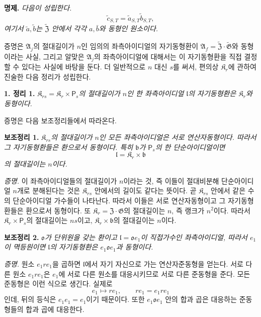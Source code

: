 \noindent\textbf{명제.} \emph{다음이 성립한다.}
\[
        \tilde c_{S,T}
        =\tilde a_{S,T}\tilde b_{S,T},
\]
\emph{여기서 \(\tilde a,\tilde b\)는 \(\widetilde{\mathfrak Z}\) 안에서 각각 \(a,\bar b\)와 동형인 원소이다.}

증명은 \(\mathfrak A_j\)의 절대길이가 \(n\)인 임의의 좌측아이디얼의 자기동형환이 \(\mathfrak A_f=\widetilde{\mathfrak Z}\mathbin{\cdot}\widetilde{\mathfrak G}\)와 동형이라는 사실, 그리고 알맞은 \(\mathfrak A_j\)의 좌측아이디얼에 대해서는 이 자기동형환을 직접 결정할 수 있다는 사실에 바탕을 둔다. 더 일반적으로 \(n\) 대신 \(s\)를 써서, 편의상 \(\mathfrak K_r\)에 관하여 진술한 다음 정리가 성립한다.

\noindent\textbf{1. 정리 1.} \emph{\(\mathfrak K_{rs}=\mathfrak K_r\times\mathsf P_s\)의 절대길이가 \(n\)인 한 좌측아이디얼 \(\mathfrak l\)의 자기동형환은 \(\mathfrak K_r\)와 동형이다.}

증명은 다음 보조정리들에서 따라온다.

\noindent\textbf{보조정리 1.} \emph{\(\mathfrak K_{rs}\)의 절대길이가 \(n\)인 모든 좌측아이디얼은 서로 연산자동형이다. 따라서 그 자기동형환들은 환으로서 동형이다. 특히 \(\mathfrak b\)가 \(\mathsf P_s\)의 한 단순아이디얼이면}
\[
        \mathfrak l=\mathfrak K_r\times\mathfrak b
\]
\emph{의 절대길이는 \(n\)이다.}

\noindent\emph{증명.} 이 좌측아이디얼들의 절대길이가 \(n\)이라는 것, 즉 이들이 절대비분해 단순아이디얼 \(n\)개로 분해된다는 것은 \(\mathfrak K_{rs}\) 안에서의 길이도 같다는 뜻이다. 곧 \(\mathfrak K_{rs}\) 안에서 같은 수의 단순아이디얼 가수들이 나타난다. 따라서 이들은 서로 연산자동형이고 그 자기동형환들은 환으로서 동형이다. 또 \(\mathfrak K_r=\mathfrak Z\mathbin{\cdot}\mathfrak G\)의 절대길이는 \(n\), 즉 랭크가 \(n^2\)이다. 따라서 \(\mathfrak K_r\times\mathsf P_s\)의 절대길이는 \(ns\)이고, \(\mathfrak K_r\times\mathfrak b\)의 절대길이는 \(n\)이다.

\noindent\textbf{보조정리 2.} \emph{\(\mathfrak o\)가 단위원을 갖는 환이고 \(\mathfrak l=\mathfrak o e_1\)이 직접가수인 좌측아이디얼, 따라서 \(e_1\)이 멱등원이면 \(\mathfrak l\)의 자기동형환은 \(e_1\mathfrak o e_1\)과 동형이다.}

\noindent\emph{증명.} 원소 \(e_1re_1\)을 곱하면 \(\mathfrak l\)에서 자기 자신으로 가는 연산자준동형을 얻는다. 서로 다른 원소 \(e_1re_1\)은 \(e_1\)에 서로 다른 원소를 대응시키므로 서로 다른 준동형을 준다. 모든 준동형은 이런 식으로 생긴다. 실제로
\[
        e_1\longmapsto re_1,
        \qquad
        re_1=e_1re_1
\]
인데, 뒤의 등식은 \(e_1e_1=e_1\)이기 때문이다. 또한 \(e_1\mathfrak o e_1\) 안의 합과 곱은 대응하는 준동형들의 합과 곱에 대응한다.

